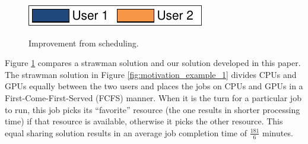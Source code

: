 \begin{figure}[!htbp]
	\centering
	{\includegraphics[width=0.45\linewidth]{figs/example_legend} }    \hspace{0.0in} \\
	\vspace{-0.1in}    \hspace{-0.1in}
	   \vspace{-0.1in} \hspace{-0.1in}		\caption{Improvement from \name scheduling.
}\vspace{-0.2in}
	\label{fig:motivation_example}
\end{figure}


Figure \ref{fig:motivation_example} compares a strawman solution and our solution \name developed in this paper.
The strawman solution in Figure \eqref{fig:motivation_example_1} divides CPUs and GPUs equally between the two users and places the jobs on CPUs and GPUs in a First-Come-First-Served (FCFS) manner. 
When it is the turn for a particular job to run, this job picks its ``favorite'' resource (the one results in shorter processing time) if that resource is available, otherwise it picks the other resource. This equal sharing solution results in an average job completion time of $\frac{181}{6}$ minutes.

